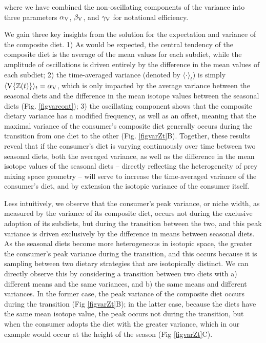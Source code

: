 \documentclass{article}
\begin{document}
\noindent where we have combined the non-oscillating components of the variance into three parameters $\alpha_{\rm V}$, $\beta_{\rm V}$, and $\gamma_{\rm V}$ for notational efficiency.

We gain three key insights from the solution for the expectation and variance of the composite diet.
1) As would be expected, the central tendency of the composite diet is the average of the mean values for each subdiet, while the amplitude of oscillations is driven entirely by the difference in the mean values of each subdiet;
2) the time-averaged variance (denoted by $\langle \cdot \rangle_t$) is simply $\langle {\rm V}\{\mathbb{Z}(t)\} \rangle_t = \alpha_{\rm V}$, which is only impacted by the average variance between the seasonal diets and the difference in the mean isotope values between the seasonal diets (Fig. \ref{figvarcont});
3) the oscillating component shows that the composite dietary variance has a modified frequency, as well as an offset, meaning that the maximal variance of the consumer's composite diet generally occurs during the transition from one diet to the other (Fig. \ref{figvarZt}B).
Together, these results reveal that if the consumer's diet is varying continuously over time between two seasonal diets, both the averaged variance, as well as the difference in the mean isotope values of the seasonal diets -- directly reflecting the heterogeneity of prey mixing space geometry -- will serve to increase the time-averaged variance of the consumer's diet, and by extension the isotopic variance of the consumer itself.

Less intuitively, we observe that the consumer's peak variance, or niche width, as measured by the variance of its composite diet, occurs not during the exclusive adoption of its subdiets, but during the transition between the two, and this peak variance is driven exclusively by the difference in means between seasonal diets.
As the seasonal diets become more heterogeneous in isotopic space, the greater the consumer's peak variance during the transition, and this occurs because it is sampling between two dietary strategies that are isotopically distinct.
We can directly observe this by considering a transition between two diets with  a) different means and the same variances, and b) the same means and different variances.
In the former case, the peak variance of the composite diet occurs during the transition (Fig \ref{figvarZt}B); in the latter case, because the diets have the same mean isotope value, the peak occurs not during the transition, but when the consumer adopts the diet with the greater variance, which in our example would occur at the height of the season (Fig \ref{figvarZt}C).
\end{document}
